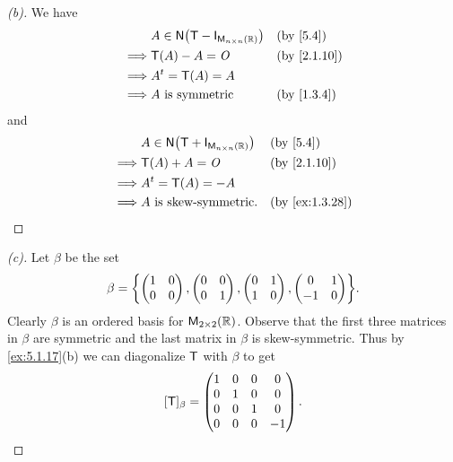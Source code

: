 \begin{proof}[(b)]
	We have
	\begin{align*}
		         & A \in \ns{\T - \IT[\ms{n}{n}{\R}]} &  & \by{5.4}    \\
		\implies & \T(A) - A = \zm                    &  & \by{2.1.10} \\
		\implies & \tp{A} = \T(A) = A                                  \\
		\implies & A \text{ is symmetric}             &  & \by{1.3.4}
	\end{align*}
	and
	\begin{align*}
		         & A \in \ns{\T + \IT[\ms{n}{n}{\R}]} &  & \by{5.4}       \\
		\implies & \T(A) + A = \zm                    &  & \by{2.1.10}    \\
		\implies & \tp{A} = \T(A) = -A                                    \\
		\implies & A \text{ is skew-symmetric}.       &  & \by{ex:1.3.28}
	\end{align*}
\end{proof}

\begin{proof}[(c)]
	Let \(\beta\) be the set
	\[
		\beta = \set{\begin{pmatrix}
				1 & 0 \\
				0 & 0
			\end{pmatrix}, \begin{pmatrix}
				0 & 0 \\
				0 & 1
			\end{pmatrix}, \begin{pmatrix}
				0 & 1 \\
				1 & 0
			\end{pmatrix}, \begin{pmatrix}
				0  & 1 \\
				-1 & 0
			\end{pmatrix}}.
	\]
	Clearly \(\beta\) is an ordered basis for \(\mathsf{M}_{{2} \times 2}({\mathbb{R}})\).
	Observe that the first three matrices in \(\beta\) are symmetric and the last matrix in \(\beta\) is skew-symmetric.
	Thus by \cref{ex:5.1.17}(b) we can diagonalize \(\mathsf{T}\) with \(\beta\) to get
	\[
		[\mathsf{T}]_{\beta} = \begin{pmatrix}
			1 & 0 & 0 & 0  \\
			0 & 1 & 0 & 0  \\
			0 & 0 & 1 & 0  \\
			0 & 0 & 0 & -1
		\end{pmatrix}.
	\]
\end{proof}

